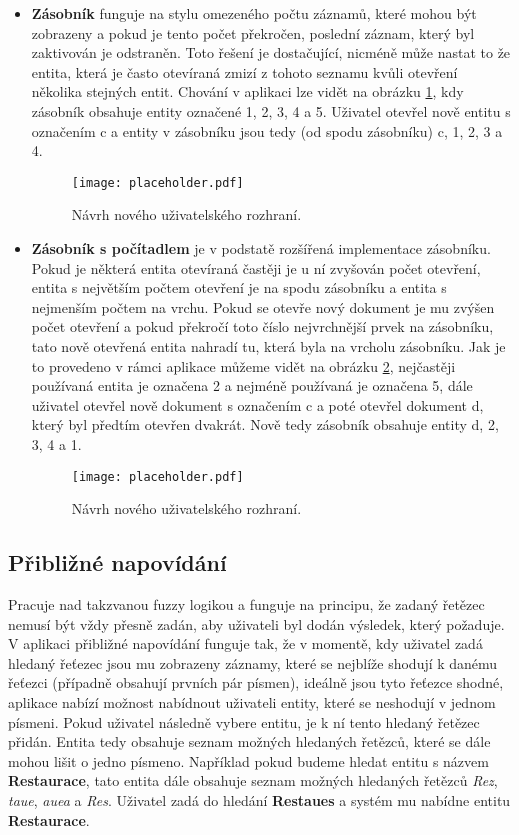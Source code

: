 \begin{itemize}
  \item \textbf{Zásobník} funguje na stylu omezeného počtu záznamů, které mohou být zobrazeny a pokud je tento počet překročen, poslední záznam, který byl zaktivován je odstraněn. Toto řešení je dostačující, nicméně může nastat to že entita, která je často otevíraná zmizí z tohoto seznamu kvůli otevření několika stejných entit. Chování v aplikaci lze vidět na obrázku \ref{zasobnik}, kdy zásobník obsahuje entity označené 1, 2, 3, 4 a 5. Uživatel otevřel nově entitu s označením c a entity v zásobníku jsou tedy (od spodu zásobníku) c, 1, 2, 3 a 4.
\begin{figure}[htp]
  \centering
  \texttt{[image: placeholder.pdf]}
  \caption{Návrh nového uživatelského rozhraní.}
  \label{zasobnik}
\end{figure}
  \item \textbf{Zásobník s počítadlem} je v podstatě rozšířená implementace zásobníku. Pokud je některá entita otevíraná častěji je u ní zvyšován počet otevření, entita s největším počtem otevření je na spodu zásobníku a entita s nejmenším počtem na vrchu. Pokud se otevře nový dokument je mu zvýšen počet otevření a pokud překročí toto číslo nejvrchnější prvek na zásobníku, tato nově otevřená entita nahradí tu, která byla na vrcholu zásobníku. Jak je to provedeno v rámci aplikace můžeme vidět na obrázku \ref{counter}, nejčastěji používaná entita je označena 2 a nejméně používaná je označena 5, dále uživatel otevřel nově dokument s označením c a poté otevřel dokument d, který byl předtím otevřen dvakrát. Nově tedy zásobník obsahuje entity d, 2, 3, 4 a 1.
\begin{figure}[htp]
  \centering
  \texttt{[image: placeholder.pdf]}
  \caption{Návrh nového uživatelského rozhraní.}
  \label{counter}
\end{figure}
\end{itemize}

\subsection{Přibližné napovídání}
\par Pracuje nad takzvanou fuzzy logikou a funguje na principu, že zadaný řetězec nemusí být vždy přesně zadán, aby uživateli byl dodán výsledek, který požaduje. V aplikaci přibližné napovídání funguje tak, že v momentě, kdy uživatel zadá hledaný řeťezec jsou mu zobrazeny záznamy, které se nejblíže shodují k danému řeťezci (případně obsahují prvních pár písmen), ideálně jsou tyto řeťezce shodné, aplikace nabízí možnost nabídnout uživateli entity, které se neshodují v jednom písmeni. Pokud uživatel následně vybere entitu, je k ní tento hledaný řetězec přidán. Entita tedy obsahuje seznam možných hledaných řetězců, které se dále mohou lišit o jedno písmeno. Například pokud budeme hledat entitu s názvem \textbf{Restaurace}, tato entita dále obsahuje seznam možných hledaných řetězců \textit{Rez}, \textit{taue}, \textit{auea} a \textit{Res}. Uživatel zadá do hledání \textbf{Restaues} a systém mu nabídne entitu \textbf{Restaurace}.
